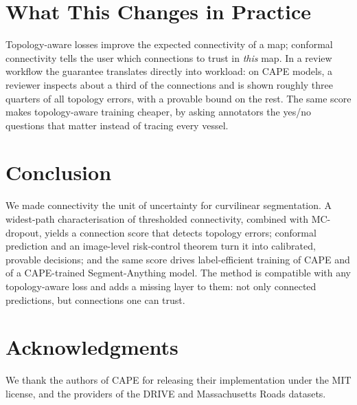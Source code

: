 \documentclass[10pt,letterpaper,journal]{IEEEtran}
\newcommand{\1}{\mathbf{1}}
\begin{document}
\section{What This Changes in Practice}\label{sec:impact}
Topology-aware losses improve the expected connectivity of a map; conformal connectivity tells the user which connections to trust in \emph{this} map. In a review workflow the guarantee translates directly into workload: on CAPE models, a reviewer inspects about a third of the connections and is shown roughly three quarters of all topology errors, with a provable bound on the rest. The same score makes topology-aware training cheaper, by asking annotators the yes/no questions that matter instead of tracing every vessel.

\section{Conclusion}
We made connectivity the unit of uncertainty for curvilinear segmentation. A widest-path characterisation of thresholded connectivity, combined with MC-dropout, yields a connection score that detects topology errors; conformal prediction and an image-level risk-control theorem turn it into calibrated, provable decisions; and the same score drives label-efficient training of CAPE and of a CAPE-trained Segment-Anything model. The method is compatible with any topology-aware loss and adds a missing layer to them: not only connected predictions, but connections one can trust.

\section*{Acknowledgments}
We thank the authors of CAPE for releasing their implementation under the MIT license, and the providers of the DRIVE and Massachusetts Roads datasets.
\end{document}
